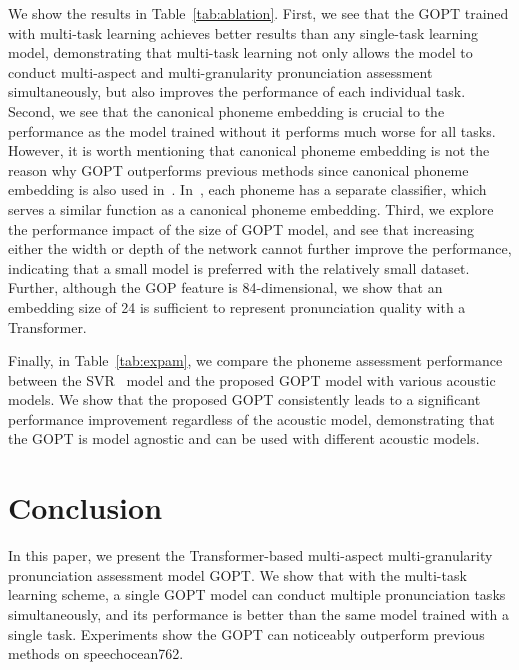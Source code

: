 \documentclass{article}
\begin{document}
We show the results in Table~\ref{tab:ablation}. First, we see that the GOPT trained with multi-task learning achieves better results than any single-task learning model, demonstrating that multi-task learning not only allows the model to conduct multi-aspect and multi-granularity pronunciation assessment simultaneously, but also improves the performance of each individual task. Second, we see that the canonical phoneme embedding is crucial to the performance as the model trained without it performs much worse for all tasks. However, it is worth mentioning that canonical phoneme embedding is not the reason why GOPT outperforms previous methods since canonical phoneme embedding is also used in~\cite{lin2021deep}. In~\cite{zhang2021speechocean762}, each phoneme has a separate classifier, which serves a similar function as a canonical phoneme embedding. Third, we explore the performance impact of the size of GOPT model, and see that increasing either the width or depth of the network cannot further improve the performance, indicating that a small model is preferred with the relatively small dataset. Further, although the GOP feature is 84-dimensional, we show that an embedding size of 24 is sufficient to represent pronunciation quality with a Transformer.

Finally, in Table~\ref{tab:expam}, we compare the phoneme assessment performance between the SVR~\cite{zhang2021speechocean762} model and the proposed GOPT model with various acoustic models. We show that the proposed GOPT consistently leads to a significant performance improvement regardless of the acoustic model, demonstrating that the GOPT is model agnostic and can be used with different acoustic models.

\section{Conclusion}

In this paper, we present the Transformer-based multi-aspect multi-granularity pronunciation assessment model GOPT. We show that with the multi-task learning scheme, a single GOPT model can conduct multiple pronunciation tasks simultaneously, and its performance is better than the same model trained with a single task. Experiments show the GOPT can noticeably outperform previous methods on speechocean762.


\newpage


\end{document}
